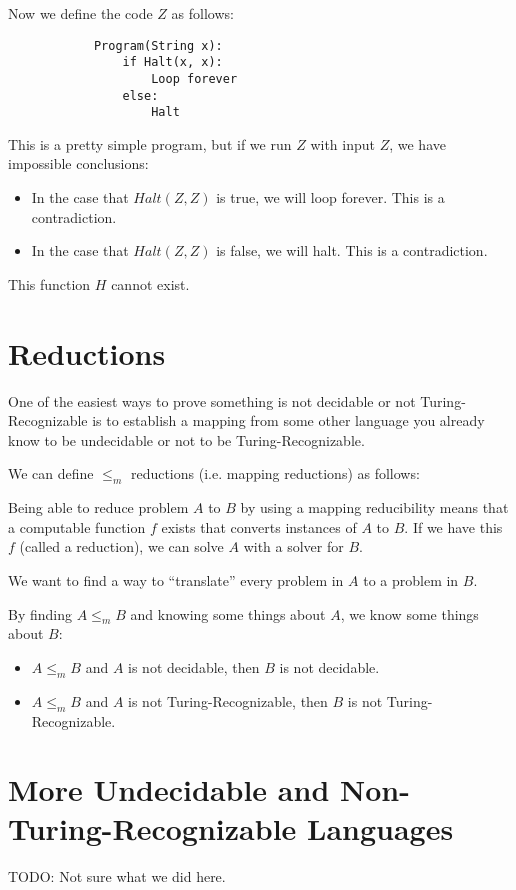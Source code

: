         Now we define the code $Z$ as follows:
        \begin{verbatim}
            Program(String x):
                if Halt(x, x):
                    Loop forever
                else:
                    Halt
        \end{verbatim}
        This is a pretty simple program, but if we run $Z$ with input $Z$, we
        have impossible conclusions:
        \begin{itemize}
            \item In the case that $Halt(Z,Z)$ is true, we will loop forever.
            This is a contradiction.
            \item In the case that $Halt(Z,Z)$ is false, we will halt. This is a
            contradiction.
        \end{itemize}
        This function $H$ cannot exist.
    \section{Reductions}
        One of the easiest ways to prove something is not decidable or
        not Turing-Recognizable is to establish a mapping from some other
        language you already know to be undecidable or not to be
        Turing-Recognizable.

        We can define $\le_m$ reductions (i.e. mapping reductions) as follows:

        Being able to reduce problem $A$ to $B$ by using a mapping reducibility
        means that a computable function $f$ exists that converts instances of
        $A$ to $B$. If we have this $f$ (called a reduction), we can solve $A$
        with a solver for $B$.

        We want to find a way to ``translate'' every problem in $A$ to a problem
        in $B$.

        By finding $A \le_m B$ and knowing some things about $A$, we know some
        things about $B$:
        \begin{itemize}
            \item $A \le_m B$ and $A$ is not decidable, then $B$ is not
            decidable.
            \item $A \le_m B$ and $A$ is not Turing-Recognizable, then $B$ is
            not Turing-Recognizable.
        \end{itemize}
    \section{More Undecidable and Non-Turing-Recognizable Languages}
        TODO: Not sure what we did here.

